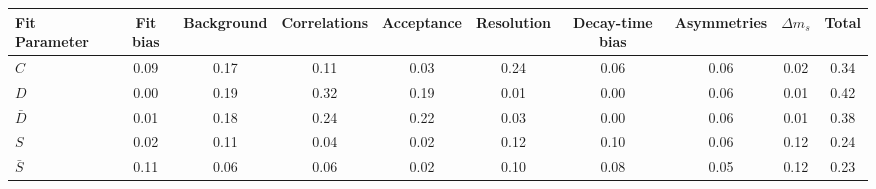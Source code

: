 \begin{tabular}{l  c  c  c  c  c  c  c  c  | c }
\hline
\hline
Fit Parameter & Fit bias & Background & Correlations & Acceptance & Resolution & Decay-time bias & Asymmetries & $\Delta m_{s}$ &  Total  \\ 
\hline
$C$ & 0.09 & 0.17 & 0.11 & 0.03 & 0.24 & 0.06 & 0.06 & 0.02 & 0.34 \\ 
$D$ & 0.00 & 0.19 & 0.32 & 0.19 & 0.01 & 0.00 & 0.06 & 0.01 & 0.42 \\ 
$\bar{D}$ & 0.01 & 0.18 & 0.24 & 0.22 & 0.03 & 0.00 & 0.06 & 0.01 & 0.38 \\ 
$S$ & 0.02 & 0.11 & 0.04 & 0.02 & 0.12 & 0.10 & 0.06 & 0.12 & 0.24 \\ 
$\bar{S}$ & 0.11 & 0.06 & 0.06 & 0.02 & 0.10 & 0.08 & 0.05 & 0.12 & 0.23 \\ 
\hline
\hline
\end{tabular}
